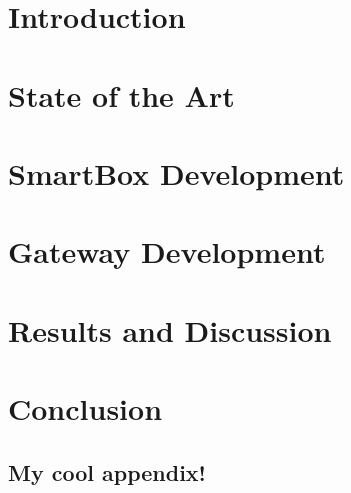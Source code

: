 \documentclass[a4paper, 12pt]{report}
\begin{document}
\newpage
\thispagestyle{empty}
\mbox{}
\chapter{Introduction}


\chapter{State of the Art}
\label{chap:stateofart}


\chapter{SmartBox Development}
\label{chap:smartbox}


\chapter{Gateway Development}
\label{chap:gateway}


\chapter{Results and Discussion}
\label{chap:results}


\chapter{Conclusion}
\label{chap:gateway}






\titleformat{\chapter}[display]	%
{\normalfont\huge\bfseries}{\chaptertitlename\ \thechapter}{20pt}{\Huge}
\begin{appendix}			%
\chapter{My cool appendix!}	%
\label{app:cool}
%
%
\end{appendix}
\end{document}
